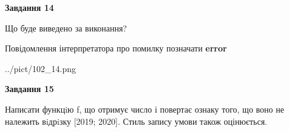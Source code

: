 \documentclass[11pt, ukrainian]{article}
\begin{document}
{\begin {large}
{\begin {center}\textbf{Завдання 14}\end {center}}\par
Що буде виведено за виконання? \par
Повідомлення інтерпретатора про помилку позначати \textbf{error}

\begin{center}
	{../pict/102_14.png}
\end{center}
\newpage

{\begin {center}\textbf{Завдання 15}\end {center}}\par

Написати функцiю f, що отримує число і повертає ознаку того, що воно не належить вiдрiзку [2019; 2020]. Стиль запису умови також оцінюється.\par
\newpage

\end {large}}
\end{document}
